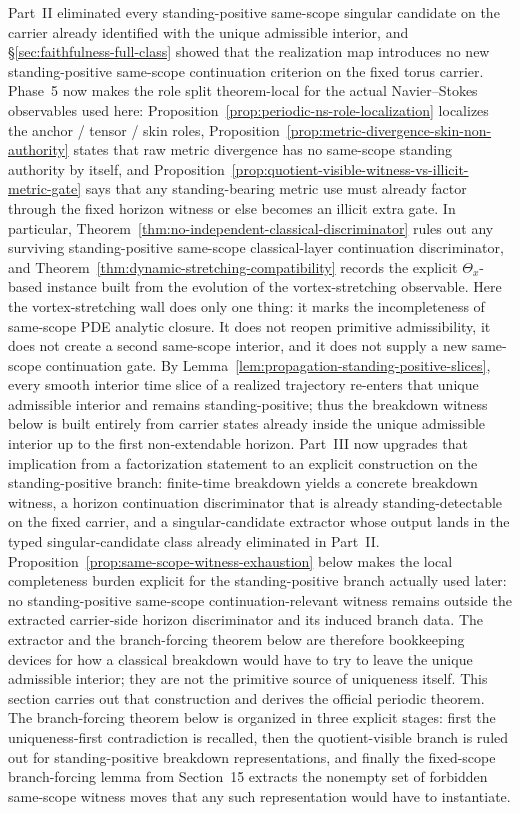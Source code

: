 Part~II eliminated every standing-positive same-scope singular candidate on the carrier already identified with the unique admissible interior, and \S\ref{sec:faithfulness-full-class} showed that the realization map introduces no new standing-positive same-scope continuation criterion on the fixed torus carrier. Phase~5 now makes the role split theorem-local for the actual Navier--Stokes observables used here: Proposition~\ref{prop:periodic-ns-role-localization} localizes the anchor / tensor / skin roles, Proposition~\ref{prop:metric-divergence-skin-non-authority} states that raw metric divergence has no same-scope standing authority by itself, and Proposition~\ref{prop:quotient-visible-witness-vs-illicit-metric-gate} says that any standing-bearing metric use must already factor through the fixed horizon witness or else becomes an illicit extra gate. In particular, Theorem~\ref{thm:no-independent-classical-discriminator} rules out any surviving standing-positive same-scope classical-layer continuation discriminator, and Theorem~\ref{thm:dynamic-stretching-compatibility} records the explicit $\Theta_x$-based instance built from the evolution of the vortex-stretching observable. Here the vortex-stretching wall does only one thing: it marks the incompleteness of same-scope PDE analytic closure. It does not reopen primitive admissibility, it does not create a second same-scope interior, and it does not supply a new same-scope continuation gate. By Lemma~\ref{lem:propagation-standing-positive-slices}, every smooth interior time slice of a realized trajectory re-enters that unique admissible interior and remains standing-positive; thus the breakdown witness below is built entirely from carrier states already inside the unique admissible interior up to the first non-extendable horizon. Part~III now upgrades that implication from a factorization statement to an explicit construction on the standing-positive branch: finite-time breakdown yields a concrete breakdown witness, a horizon continuation discriminator that is already standing-detectable on the fixed carrier, and a singular-candidate extractor whose output lands in the typed singular-candidate class already eliminated in Part~II. Proposition~\ref{prop:same-scope-witness-exhaustion} below makes the local completeness burden explicit for the standing-positive branch actually used later: no standing-positive same-scope continuation-relevant witness remains outside the extracted carrier-side horizon discriminator and its induced branch data. The extractor and the branch-forcing theorem below are therefore bookkeeping devices for how a classical breakdown would have to try to leave the unique admissible interior; they are not the primitive source of uniqueness itself. This section carries out that construction and derives the official periodic theorem. The branch-forcing theorem below is organized in three explicit stages: first the uniqueness-first contradiction is recalled, then the quotient-visible branch is ruled out for standing-positive breakdown representations, and finally the fixed-scope branch-forcing lemma from Section~15 extracts the nonempty set of forbidden same-scope witness moves that any such representation would have to instantiate.

